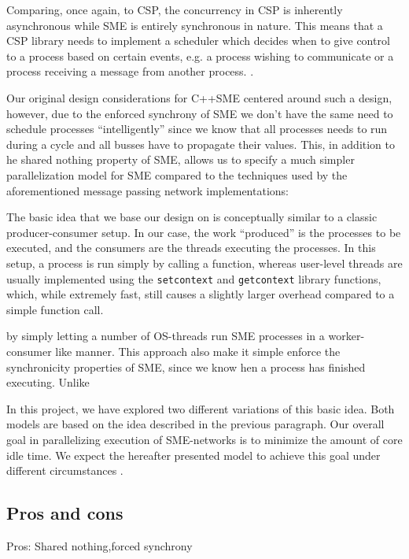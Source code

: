 Comparing, once again, to CSP, the concurrency in CSP is inherently
asynchronous while SME is entirely synchronous in nature. This means
that a CSP library needs to implement a scheduler which decides when
to give control to a process based on certain events, e.g. a process
wishing to communicate or a process receiving a message from another
process. .

Our original design considerations for C++SME centered around such a
design, however, due to the enforced synchrony of SME we don't have
the same need to schedule processes ``intelligently'' since we know
that all processes needs to run during a cycle and all busses have to
propagate their values. This, in addition to he shared nothing
property of SME, allows us to specify a much simpler parallelization
model for SME compared to the techniques used by the aforementioned
message passing network implementations:

The basic idea that we base our design on is conceptually similar to a
classic producer-consumer setup. In our case, the work ``produced'' is
the processes to be executed, and the consumers are the threads
executing the processes. In this setup, a process is run simply by
calling a function, whereas user-level threads are usually implemented
using the \texttt{setcontext} and \texttt{getcontext} library
functions, which, while extremely fast, still causes a slightly larger
overhead compared to a simple function call. 

by simply letting a number of OS-threads run SME processes in a
worker-consumer like manner. This approach also make it simple enforce
the synchronicity properties of SME, since we know hen a process has
finished executing. Unlike

In this project, we have explored two different variations of this
basic idea. Both models are based on the idea described in the
previous paragraph. Our overall goal in parallelizing execution of
SME-networks is to minimize the amount of core idle time. We expect
the hereafter presented model to achieve this goal under different
circumstances .



\subsection{Pros and cons}
Pros: Shared nothing,forced synchrony 

